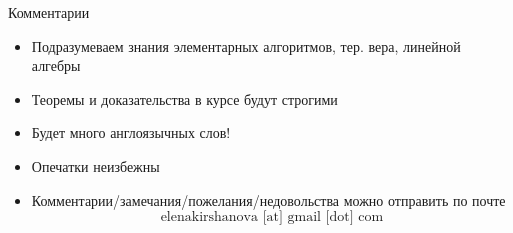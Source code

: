 \documentclass[usenames,dvipsnames,8pt,aspectratio=169]{beamer}
\begin{document}
\begin{frame}{Комментарии}

\Large
\begin{itemize}
	\itemsep 8pt
	\item Подразумеваем знания элементарных алгоритмов, тер. вера, линейной алгебры
	\item Теоремы и доказательства в курсе будут строгими
	\item Будет много англоязычных слов!
	\item  Опечатки неизбежны
	\item Комментарии/замечания/пожелания/недовольства можно отправить по почте
	\[
	\text{elenakirshanova [at] gmail [dot] com}
	\]
\end{itemize}

\end{frame}
\end{document}
